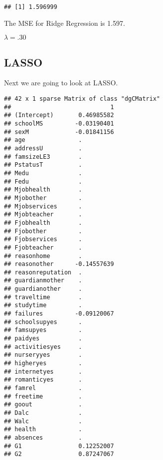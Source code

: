 \documentclass[
]{article}
\newenvironment{Shaded}{\begin{snugshade}}{\end{snugshade}}
\newcommand{\AttributeTok}[1]{\textcolor[rgb]{0.77,0.63,0.00}{#1}}
\newcommand{\DecValTok}[1]{\textcolor[rgb]{0.00,0.00,0.81}{#1}}
\newcommand{\FunctionTok}[1]{\textcolor[rgb]{0.00,0.00,0.00}{#1}}
\newcommand{\NormalTok}[1]{#1}
\newcommand{\OtherTok}[1]{\textcolor[rgb]{0.56,0.35,0.01}{#1}}
\newcommand{\SpecialCharTok}[1]{\textcolor[rgb]{0.00,0.00,0.00}{#1}}
\newcommand{\StringTok}[1]{\textcolor[rgb]{0.31,0.60,0.02}{#1}}
\begin{document}
\begin{verbatim}
## [1] 1.596999
\end{verbatim}

The MSE for Ridge Regression is 1.597.

\(\lambda = .30\)

\hypertarget{lasso}{%
\subsection{LASSO}\label{lasso}}

Next we are going to look at LASSO.

\begin{Shaded}
\end{Shaded}

\begin{verbatim}
## 42 x 1 sparse Matrix of class "dgCMatrix"
##                            1
## (Intercept)       0.46985582
## schoolMS         -0.03190401
## sexM             -0.01841156
## age               .         
## addressU          .         
## famsizeLE3        .         
## PstatusT          .         
## Medu              .         
## Fedu              .         
## Mjobhealth        .         
## Mjobother         .         
## Mjobservices      .         
## Mjobteacher       .         
## Fjobhealth        .         
## Fjobother         .         
## Fjobservices      .         
## Fjobteacher       .         
## reasonhome        .         
## reasonother      -0.14557639
## reasonreputation  .         
## guardianmother    .         
## guardianother     .         
## traveltime        .         
## studytime         .         
## failures         -0.09120067
## schoolsupyes      .         
## famsupyes         .         
## paidyes           .         
## activitiesyes     .         
## nurseryyes        .         
## higheryes         .         
## internetyes       .         
## romanticyes       .         
## famrel            .         
## freetime          .         
## goout             .         
## Dalc              .         
## Walc              .         
## health            .         
## absences          .         
## G1                0.12252007
## G2                0.87247067
\end{verbatim}
\end{document}
